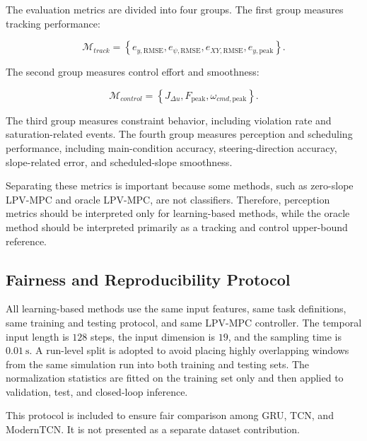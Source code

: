 \documentclass{ieeeaccess}
\begin{document}
The evaluation metrics are divided into four groups. The first group measures tracking performance:

\begin{equation}
\mathcal{M}_{track}
=
\left\{
e_{y,\mathrm{RMSE}},
e_{\psi,\mathrm{RMSE}},
e_{XY,\mathrm{RMSE}},
e_{y,\mathrm{peak}}
\right\}.
\label{eq:tracking_metrics}
\end{equation}

The second group measures control effort and smoothness:

\begin{equation}
\mathcal{M}_{control}
=
\left\{
J_{\Delta u},
F_{\mathrm{peak}},
\omega_{cmd,\mathrm{peak}}
\right\}.
\label{eq:control_metrics}
\end{equation}

The third group measures constraint behavior, including violation rate and saturation-related events. The fourth group measures perception and scheduling performance, including main-condition accuracy, steering-direction accuracy, slope-related error, and scheduled-slope smoothness.



Separating these metrics is important because some methods, such as zero-slope LPV-MPC and oracle LPV-MPC, are not classifiers. Therefore, perception metrics should be interpreted only for learning-based methods, while the oracle method should be interpreted primarily as a tracking and control upper-bound reference.



\subsection{Fairness and Reproducibility Protocol}



All learning-based methods use the same input features, same task definitions, same training and testing protocol, and same LPV-MPC controller. The temporal input length is $128$ steps, the input dimension is $19$, and the sampling time is $0.01~\mathrm{s}$. A run-level split is adopted to avoid placing highly overlapping windows from the same simulation run into both training and testing sets. The normalization statistics are fitted on the training set only and then applied to validation, test, and closed-loop inference.



This protocol is included to ensure fair comparison among GRU, TCN, and ModernTCN. It is not presented as a separate dataset contribution.
\end{document}
